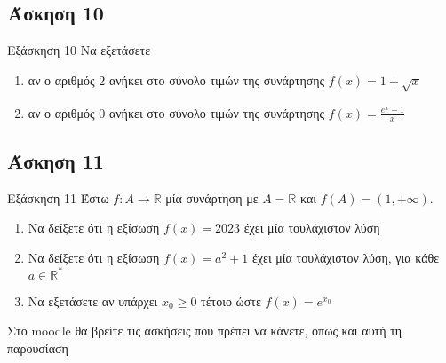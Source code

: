 \documentclass[greek]{beamer}
\begin{document}

\subsection{Άσκηση 10}
\begin{frame}[label=Άσκηση10,t]{Εξάσκηση 10}
      Να εξετάσετε
      \begin{enumerate}
            \item<1-> αν ο αριθμός $2$ ανήκει στο σύνολο τιμών της συνάρτησης $f(x)=1+\sqrt{x}$
            \item<2-> αν ο αριθμός $0$ ανήκει στο σύνολο τιμών της συνάρτησης $f(x)=\frac{e^x-1}{x}$
      \end{enumerate}
\end{frame}

\subsection{Άσκηση 11}
\begin{frame}[label=Άσκηση11,t]{Εξάσκηση 11}
      Έστω $f:A\to\mathbb{R}$ μία συνάρτηση με $A=\mathbb{R}$ και $f(A)=(1,+\infty)$.
      \begin{enumerate}
            \item<1-> Να δείξετε ότι η εξίσωση $f(x)=2023$ έχει μία τουλάχιστον λύση
            \item<2-> Να δείξετε ότι η εξίσωση $f(x)=a^2+1$ έχει μία τουλάχιστον λύση, για κάθε $a\in\mathbb{R^*}$
            \item<3-> Να εξετάσετε αν υπάρχει $x_0\ge 0$ τέτοιο ώστε $f(x)=e^{x_0}$
      \end{enumerate}
\end{frame}

\begin{frame}
      Στο moodle θα βρείτε τις ασκήσεις που πρέπει να κάνετε, όπως και αυτή τη παρουσίαση
\end{frame}
\end{document}
